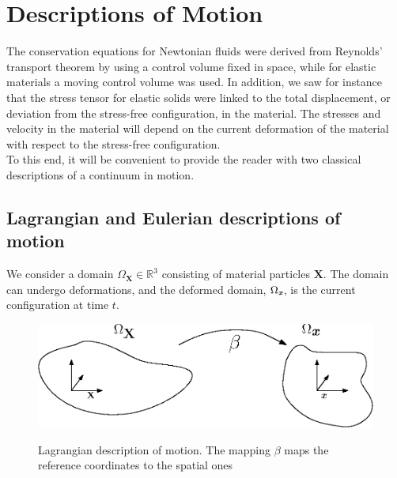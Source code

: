 \section{Descriptions of Motion} \label{sec:DoM}
The conservation equations for Newtonian fluids were derived from Reynolds' transport theorem by using a control volume fixed in space, while for elastic materials a moving control volume was used. In addition, we saw for instance that the stress tensor for elastic solids were linked to the total displacement, or deviation from the stress-free configuration, in the material. The stresses and velocity in the material will depend on the current deformation of the material with respect to the stress-free configuration. 
\\To this end, it will be convenient to provide the reader with two classical descriptions of a continuum in motion. 
\subsection{Lagrangian and Eulerian descriptions of motion}
We consider a domain $\Omega_{\mathbf{X}} \in \mathbb{R}^3$ consisting of material particles $\mathbf{X}$. The domain can undergo deformations, and the deformed domain, $\Omega_{\textit{\textbf{x}}}$, is the current configuration at time $t$. 
\begin{center}
\begin{figure}[!ht]
\includegraphics{figures/Lagrangian_domain} \label{Lagrangian}
\caption{Lagrangian description of motion. The mapping $\beta$ maps the reference coordinates to the spatial ones}
\end{figure}
\end{center}


